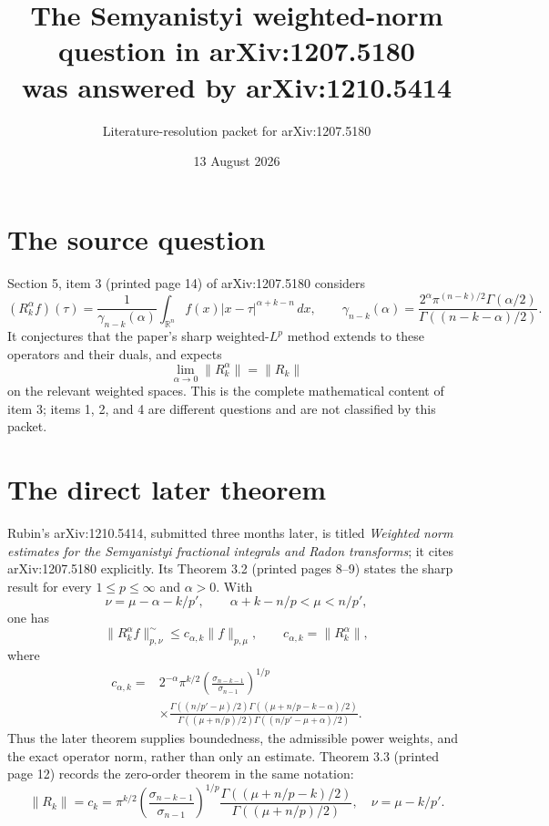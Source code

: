 \documentclass[11pt]{article}
\title{The Semyanistyi weighted-norm question in arXiv:1207.5180\\
was answered by arXiv:1210.5414}
\author{Literature-resolution packet for arXiv:1207.5180}
\date{13 August 2026}
\newcommand{\R}{\mathbb R}
\newcommand{\norm}[1]{\lVert#1\rVert}
\newcommand{\sig}{\sigma}
\begin{document}
\maketitle

\begin{center}
\end{center}

\section{The source question}

Section 5, item 3 (printed page 14) of arXiv:1207.5180 considers
\[
 (R_k^\alpha f)(\tau)=\frac{1}{\gamma_{n-k}(\alpha)}
 \int_{\R^n}f(x)|x-\tau|^{\alpha+k-n}\,dx,
 \qquad
 \gamma_{n-k}(\alpha)=
 \frac{2^\alpha\pi^{(n-k)/2}\Gamma(\alpha/2)}
 {\Gamma((n-k-\alpha)/2)}.
\]
It conjectures that the paper's sharp weighted-$L^p$ method extends to these
operators and their duals, and expects
\[
 \lim_{\alpha\to0}\norm{R_k^\alpha}=\norm{R_k}
\]
on the relevant weighted spaces.  This is the complete mathematical content
of item 3; items 1, 2, and 4 are different questions and are not classified
by this packet.

\section{The direct later theorem}

Rubin's arXiv:1210.5414, submitted three months later, is titled
\emph{Weighted norm estimates for the Semyanistyi fractional integrals and
Radon transforms}; it cites arXiv:1207.5180 explicitly.  Its Theorem 3.2
(printed pages 8--9) states the sharp result for every $1\le p\le\infty$ and
$\alpha>0$.  With
\[
 \nu=\mu-\alpha-k/p',
 \qquad \alpha+k-n/p<\mu<n/p',
\]
one has
\[
 \norm{R_k^\alpha f}_{p,\nu}^{\sim}
 \le c_{\alpha,k}\norm f_{p,\mu},
 \qquad c_{\alpha,k}=\norm{R_k^\alpha},
\]
where
\begin{align*}
c_{\alpha,k}
={}&2^{-\alpha}\pi^{k/2}
 \left(\frac{\sig_{n-k-1}}{\sig_{n-1}}\right)^{1/p}\\
&\times
\frac{\Gamma((n/p'-\mu)/2)
      \Gamma((\mu+n/p-k-\alpha)/2)}
     {\Gamma((\mu+n/p)/2)
      \Gamma((n/p'-\mu+\alpha)/2)}.
\end{align*}
Thus the later theorem supplies boundedness, the admissible power weights,
and the exact operator norm, rather than only an estimate.  Theorem 3.3
(printed page 12) records the zero-order theorem in the same notation:
\[
 \norm{R_k}=c_k=
 \pi^{k/2}\left(\frac{\sig_{n-k-1}}{\sig_{n-1}}\right)^{1/p}
 \frac{\Gamma((\mu+n/p-k)/2)}
      {\Gamma((\mu+n/p)/2)},
 \quad \nu=\mu-k/p'.
\]
\end{document}
